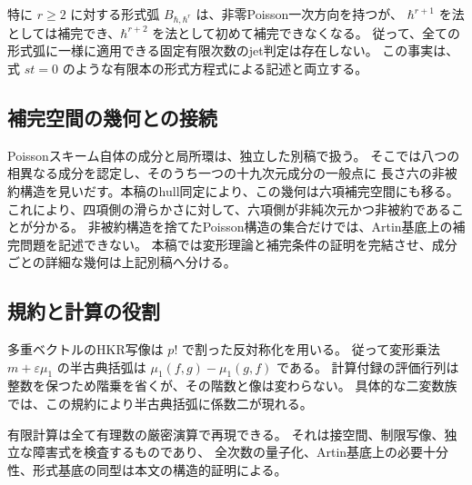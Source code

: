 特に $r\ge2$ に対する形式弧 $B_{\hbar,\hbar^r}$ は、非零Poisson一次方向を持つが、
$\hbar^{r+1}$ を法としては補完でき、$\hbar^{r+2}$ を法として初めて補完できなくなる。
従って、全ての形式弧に一様に適用できる固定有限次数のjet判定は存在しない。
この事実は、式 $st=0$ のような有限本の形式方程式による記述と両立する。


\subsection{補完空間の幾何との接続}
Poissonスキーム自体の成分と局所環は、独立した別稿\cite{VKPoisson32}で扱う。
そこでは八つの相異なる成分を認定し、そのうち一つの十九次元成分の一般点に
長さ六の非被約構造を見いだす。本稿のhull同定により、この幾何は六項補完空間にも移る。
これにより、四項側の滑らかさに対して、六項側が非純次元かつ非被約であることが分かる。
非被約構造を捨てたPoisson構造の集合だけでは、Artin基底上の補完問題を記述できない。
本稿では変形理論と補完条件の証明を完結させ、成分ごとの詳細な幾何は上記別稿へ分ける。

\subsection{規約と計算の役割}

多重ベクトルのHKR写像は $p!$ で割った反対称化を用いる。
従って変形乗法 $m+\varepsilon\mu_1$ の半古典括弧は
$\mu_1(f,g)-\mu_1(g,f)$ である。
計算付録の評価行列は整数を保つため階乗を省くが、その階数と像は変わらない。
具体的な二変数族では、この規約により半古典括弧に係数二が現れる。

有限計算は全て有理数の厳密演算で再現できる。
それは接空間、制限写像、独立な障害式を検査するものであり、
全次数の量子化、Artin基底上の必要十分性、形式基底の同型は本文の構造的証明による。
